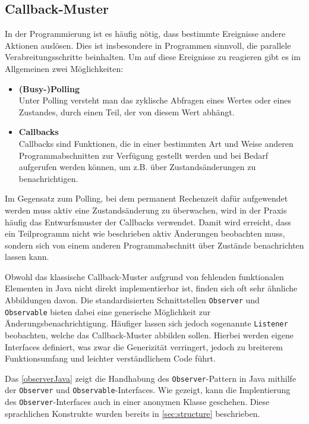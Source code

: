 \subsection{Callback-Muster}
In der Programmierung ist es häufig nötig, dass bestimmte Ereignisse andere Aktionen auslösen. Dies ist insbesondere in Programmen sinnvoll, die parallele Verabreitungsschritte beinhalten. Um auf diese Ereignisse zu reagieren gibt es im Allgemeinen zwei Möglichkeiten: 

\begin{itemize}
    \item \textbf{(Busy-)Polling}\\
    Unter Polling versteht man das zyklische Abfragen eines Wertes oder eines Zustandes, durch einen Teil, der von diesem Wert abhängt.
    \item \textbf{Callbacks}\\
    Callbacks sind Funktionen, die in einer bestimmten Art und Weise anderen Programmabschnitten zur Verfügung gestellt werden und bei Bedarf aufgerufen werden können, um z.B. über Zustandsänderungen zu benachrichtigen.
\end{itemize}

Im Gegensatz zum Polling, bei dem permanent Rechenzeit dafür aufgewendet werden muss aktiv eine Zustandsänderung zu überwachen, wird in der Praxis häufig das Entwurfsmuster der Callbacks verwendet. Damit wird erreicht, dass ein Teilprogramm nicht wie beschrieben aktiv Änderungen beobachten muss, sondern sich von einem anderen Programmabschnitt über Zustände benachrichten lassen kann. 

Obwohl das klassische Callback-Muster aufgrund von fehlenden funktionalen Elementen in Java nicht direkt implementierbar ist, finden sich oft sehr ähnliche Abbildungen davon. Die standardisierten Schnittstellen  \texttt{Observer} und \texttt{Observable} bieten dabei eine generische Möglichkeit zur Änderungsbenachrichtigung. Häufiger lassen sich jedoch sogenannte \texttt{Listener} beobachten, welche das Callback-Muster abbilden sollen. Hierbei werden eigene Interfaces definiert, was zwar die Generizität verringert, jedoch zu breiterem Funktionsumfang und leichter verständlichem Code führt.

Das \autoref{observerJava} zeigt die Handhabung des \texttt{Observer}-Pattern \cite{gamma_design_1995} in Java mithilfe der \texttt{Observer} und \texttt{Observable}-Interfaces. Wie gezeigt, kann die Implentierung des \texttt{Observer}-Interfaces auch in einer anonymen Klasse geschehen. Diese sprachlichen Konstrukte wurden bereits in \autoref{sec:structure} beschrieben. 

